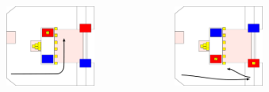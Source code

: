 \documentclass{beamer}
\begin{document}
\begin{frame}
\begin{columns}
\begin{figure}
  \end{figure}
  \begin{figure}
   \includegraphics[scale=0.15]{assets/paths/31_LL}
  \end{figure}
  \begin{figure}
   \includegraphics[scale=0.15]{assets/paths/31_RR}
  \end{figure}
 \end{columns}
\end{frame}
\end{document}
